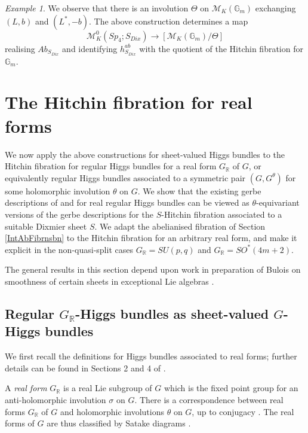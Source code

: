 \documentclass{amsart}
\theoremstyle{remark}
\newtheorem{example}[theorem]{Example}
\numberwithin{theorem}{section}
\numberwithin{equation}{section}
\begin{document}
\begin{example}
We observe that there is an involution $\Theta$ on $\mathcal M_K(\mathbb{G}_m)$ exchanging $(L,b)$ and $(L^*,-b)$. The above construction determines a map
\begin{equation}\label{Sp4DixAbneqn}
   \mathcal M_K^0(Sp_4;S_{Dix}) \rightarrow [\mathcal M_K(\mathbb{G}_m)/\Theta] 
\end{equation}
realising $Ab_{S_{Dix}}$ and identifying $h_{S_{Dix}}^{ab}$ with the quotient of the Hitchin fibration for $\mathbb{G}_m$.
\end{example}

\section{The Hitchin fibration for real forms}\label{RealHitchinscn}
We now apply the above constructions for sheet-valued Higgs bundles to the Hitchin fibration for regular Higgs bundles for a real form $G_{\mathbb{R}}$ of $G$, or equivalently  regular Higgs bundles associated to a symmetric pair $(G,G^\theta)$ for some holomorphic involution $\theta$ on $G$. We show that the existing gerbe descriptions of \cite{GPPN} and \cite{HM} for real regular Higgs bundles can be viewed as $\theta$-equivariant versions of the gerbe descriptions for the $S$-Hitchin fibration associated to a suitable Dixmier sheet $S$. We adapt the abelianised fibration of Section \ref{IntAbFibrnsbn} to the Hitchin fibration for an arbitrary real form, and make it explicit in the non-quasi-split cases $G_{\mathbb{R}}=SU(p,q)$ and $G_{\mathbb{R}}=SO^*(4m+2)$. 

The general results in this section depend upon work in preparation of Bulois on smoothness of certain sheets in exceptional Lie algebras \cite{Bulois}.

\subsection{Regular \texorpdfstring{$G_{\mathbb{R}}$}{GR}-Higgs bundles as sheet-valued \texorpdfstring{$G$}{G}-Higgs bundles}\label{RealHitchinsbn}

We first recall the definitions for Higgs bundles associated to real forms; further details can be found in Sections 2 and 4 of \cite{GPPN}.
 
A \emph{real form} $G_{\mathbb{R}}$ is a real Lie subgroup of $G$ which is the fixed point group for an anti-holomorphic involution $\sigma$ on $G$. There is a correspondence between real forms $G_\mathbb{R}$ of $G$ and holomorphic involutions $\theta$ on $G$, up to conjugacy \cite[Section VI.3]{Knapp}. The real forms of $G$ are thus classified by Satake diagrams  \cite{Araki}.
\end{document}
